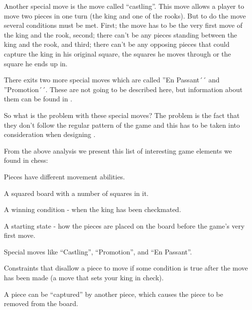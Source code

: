 Another special move is the move called ``castling''. This move allows a player
to move two pieces in one turn (the king and one of the rooks). But to do the
move several conditions must be met. First; the move has to be the very first
move of the king and the rook, second; there can't be any pieces standing
between the king and the rook, and third; there can't be any opposing pieces
that could capture the king in his original square, the squares he moves through
or the square he ends up in.
\cite{chessrules} 

There exits two more special moves which are called ''En Passant´´ and
''Promotion´´. These are not going to be described here, but information about
them can be found in \cite{chessrules}. 

So what is the problem with these special moves? The problem is the fact that
they don't follow the regular pattern of the game and this has to be taken into
consideration when designing \productname{}.


From the above analysis we present this list of interesting game elements we found 
in chess:

\begin{dlist}
\item Pieces have different movement abilities.
\item A squared board with a number of squares in it.
\item A winning condition - when the king has been checkmated.
\item A starting state - how the pieces are placed on the board before the
  game's very first move.
\item Special moves like ``Castling'', ``Promotion'', and ``En Passant''.
\item Constraints that disallow a piece to move if some condition is true after
  the move has been made (a move that sets your king in check).
\item A piece can be ``captured'' by another piece, which causes the piece to be
  removed from the board.
\end{dlist}
